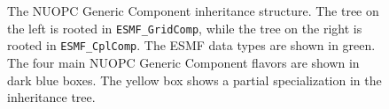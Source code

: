 \begin{figure}[h]
\begin{center}
\vspace{.5in}
\end{center}
\caption{The NUOPC Generic Component inheritance structure. The tree on the left is rooted in {\tt ESMF\_GridComp}, while the tree on the right is rooted in {\tt ESMF\_CplComp}. The ESMF data types are shown in green. The four main NUOPC Generic Component flavors are shown in dark blue boxes. The yellow box shows a partial specialization in the inheritance tree.}
\label{fig:NUOPCGenericComp}
\end{figure}



